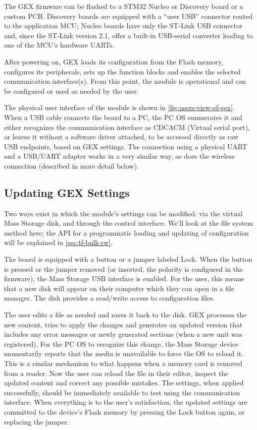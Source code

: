 The GEX firmware can be flashed to a STM32 Nucleo or Discovery board or a custom \gls{PCB}. Discovery boards are equipped with a ``user \gls{USB}'' connector routed to the application \gls{MCU}; Nucleo boards have only the ST-Link \gls{USB} connector and, since the ST-Link version 2.1, offer a built-in USB-serial converter leading to one of the \gls{MCU}'s hardware \glspl{UART}.

After powering on, GEX loads its configuration from the Flash memory, configures its peripherals, sets up the function blocks and enables the selected communication interface(s). From this point, the module is operational and can be configured or used as needed by the user.

The physical user interface of the module is shown in \cref{fig:users-view-of-gex}. When a \gls{USB} cable connects the board to a \gls{PC}, the \gls{PC} \gls{OS} enumerates it and either recognizes the communication interface as \gls{CDCACM} (Virtual serial port), or leaves it without a software driver attached, to be accessed directly as raw \gls{USB} endpoints, based on GEX settings.
The connection using a physical UART and a USB/UART adapter works in a very similar way, as does the wireless connection (described in more detail below).

\subsection{Updating GEX Settings}

Two ways exist in which the module's settings can be modified: via the virtual Mass Storage disk, and through the control interface. We'll look at the file system method here; the API for a programmatic loading and updating of configuration will be explained in \cref{sec:tf-bulk-rw}.

The board is equipped with a button or a jumper labeled Lock. When the button is pressed or the jumper removed (or inserted, the polarity is configured in the firmware), the Mass Storage \gls{USB} interface is enabled. For the user, this means that a new disk will appear on their computer which they can open in a file manager. The disk provides a read/write access to configuration files.

The user edits a file as needed and saves it back to the disk. GEX processes the new content, tries to apply the changes and generates an updated version that includes any error messages or newly generated sections (when a new unit was registered). For the \gls{PC} \gls{OS} to recognize this change, the Mass Storage device momentarily reports that the media is unavailable to force the \gls{OS} to reload it. This is a similar mechanism to what happens when a memory card is removed from a reader. Now the user can reload the file in their editor, inspect the updated content and correct any possible mistakes. The settings, when applied successfully, should be immediately available to test using the communication interface. When everything is to the user's satisfaction, the updated settings are committed to the device's Flash memory by pressing the Lock button again, or replacing the jumper.

